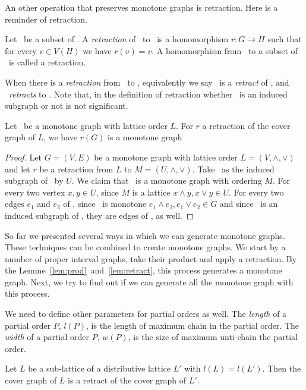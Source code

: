 An other operation that preserves monotone graphs is retraction. Here is a reminder 
of retraction.
\begin{defi} [Retraction]
Let \mH\ be a subset of \mG\@. A \emph{retraction} of \mG\ to \mH\ is a 
homomorphism \(r: G\to H\) such that for every \(v\in V(H)\) we have
\(r(v) = v\)\@.
A homomorphism from \mG\ to a subset of \mG\ is called a retraction.
\end{defi}
When there is a \emph{retraction} from \mH\ to \mG, equivalently we say
\mH\ is a \emph{retract} of \mG, and \mG\ \emph{retracts} to \mH\@.
Note that, in the definition of retraction whether \mH\ is an induced subgraph or not 
is not significant.

\begin{lemma} \label{lem:retract}
Let \mG\ be a monotone graph with lattice order \(L\)\@.
For \(r\) a retraction of the cover graph of \(L\), we have \(r(G)\) is a monotone graph
\end{lemma}

\begin{proof}
Let \(G=(V,E)\) be a monotone graph with lattice order \(L=(V, \wedge,\vee)\) and
let \(r\) be a retraction from \(L\) to \(M =(U, \wedge, \vee)\)\@.
Take \mH\ as the induced subgraph of \mG\ by \(U\)\@.
We claim that \mH\ is a monotone graph with ordering \(M\)\@.
For every two vertex \(x,y\in U\), since \(M\) is a lattice
\(x\wedge y,x\vee y\in U\)\@. For every two edges \(e_1\) and \(e_2\) of
\mH, since \mG\ is monotone \(e_1\wedge e_2,e_1\vee e_2\in G\)
and since \mH\ is an induced subgraph of \mG, they are edges of 
\mH, as well.
\end{proof}

So far we presented several ways in which we can generate monotone graphs.
These techniques can be combined to create monotone graphs.
We start by a number of proper interval graphs, take their product and apply a retraction.
By the Lemme~\ref{lem:prod}~and~\ref{lem:retract}, this process generates a monotone graph.
Next, we try to find out if we can generate all the monotone graph with this process.

We need to define other parameters for partial orders as well.
The \emph{length} of a partial order \(P\), \(l(P)\), is the length of maximum chain in
the partial order. The \emph{width} of a partial order \(P\),
\(w(P)\), is the size of maximum unti-chain the partial order.

\begin{theorem}  \label{thm:DR}
Let \(L\) be a sub-lattice of a distributive lattice \(L'\) with
\(l(L)=l(L')\)\@. Then the cover graph of \(L\) is a retract of the cover graph of 
\(L'\)\@.
\end{theorem}

